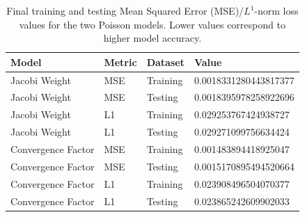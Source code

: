 \documentclass[review]{siamart190516}
\begin{document}
\begin{table}[t]
\centering
\begin{tabular}{|l|l|l|l|}
\hline
Model & Metric & Dataset & Value \\

\hline
Jacobi Weight & MSE & Training & 0.0018331280443817377 \\
Jacobi Weight & MSE & Testing & 0.0018395978258922696 \\
Jacobi Weight & L1 & Training & 0.029253767424938727 \\
Jacobi Weight & L1 & Testing & 0.029271099756634424 \\
\hline
Convergence Factor & MSE & Training & 0.001483894418925047 \\
Convergence Factor & MSE & Testing & 0.0015170895494520664 \\
Convergence Factor & L1 & Training & 0.023908496504070377 \\
Convergence Factor & L1 & Testing & 0.023865242609902033 \\
\hline
\end{tabular}
\caption{Final training and testing Mean Squared Error (MSE)/$L^1$-norm loss values for the two Poisson models.  Lower values correspond to higher model accuracy.}
\label{tab:poisson_loss}
\end{table}
\end{document}
